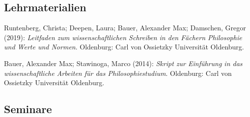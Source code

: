 \documentclass[a4paper,10pt]{article}
\newenvironment{literature}{%
   \parskip6pt\parindent0pt\raggedright
   \def\lititem{\hangindent=1cm\hangafter1}}{%
   \par\ignorespaces}
\begin{document}
\subsection*{Lehrmaterialien}
\begin{literature}
\lititem Runtenberg, Christa; Deepen, Laura; Bauer, Alexander Max; Damschen, Gregor (2019): \textit{Leitfaden zum wissenschaftlichen Schreiben in den Fächern Philosophie und Werte und Normen}. Oldenburg: Carl von Ossietzky Universität Oldenburg.

\lititem Bauer, Alexander Max; Stawinoga, Marco (2014): \textit{Skript zur Einführung in das wissenschaftliche Arbeiten für das Philosophiestudium}. Oldenburg: Carl von Ossietzky Universität Oldenburg.
\end{literature}

\subsection*{Seminare}
\end{document}
